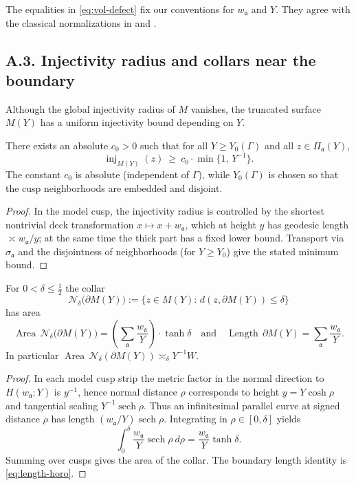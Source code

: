 \begin{remark}
The equalities in \eqref{eq:vol-defect} fix our conventions
for $w_{\mathfrak a}$ and $Y$. They agree with the classical normalizations in
\cite[Chap.~3]{Buser1992} and \cite[§3]{Iwaniec2002}.
\end{remark}

\subsection*{A.3. Injectivity radius and collars near the boundary}

\noindent
Although the global injectivity radius of $M$ vanishes, the truncated surface
$M(Y)$ has a uniform injectivity bound depending on $Y$.

\begin{lemma}\label{lem:inj-cusp}
There exists an absolute $c_0>0$ such that for all $Y\ge Y_0(\Gamma)$ and all
$z\in \Pi_{\mathfrak a}(Y)$,
\[
\operatorname{inj}_{M(Y)}(z)\ \ge\ c_0\cdot \min\{1,\,Y^{-1}\}.
\]
The constant $c_0$ is absolute (independent of $\Gamma$), while $Y_0(\Gamma)$ is
chosen so that the cusp neighborhoods are embedded and disjoint.
\end{lemma}

\begin{proof}
In the model cusp, the injectivity radius is controlled by the shortest
nontrivial deck transformation $x\mapsto x+w_{\mathfrak a}$, which at height
$y$ has geodesic length $\asymp w_{\mathfrak a}/y$; at the same time the thick
part has a fixed lower bound. Transport via $\sigma_{\mathfrak a}$ and the
disjointness of neighborhoods (for $Y\ge Y_0$) give the stated minimum bound.
\end{proof}

\begin{proposition}\label{prop:collar}
For $0<\delta\le \tfrac12$ the collar
\[
\mathcal N_\delta\big(\partial M(Y)\big):=\{z\in M(Y):\, d(z,\partial M(Y))\le \delta\}
\]
has area
\[
\operatorname{Area}\,\mathcal N_\delta\big(\partial M(Y)\big)
=\left(\sum_{\mathfrak a}\frac{w_{\mathfrak a}}{Y}\right)\cdot \tanh\delta
\quad\text{and}\quad
\operatorname{Length}\,\partial M(Y)=\sum_{\mathfrak a}\frac{w_{\mathfrak a}}{Y}.
\]
In particular $\operatorname{Area}\,\mathcal N_\delta(\partial M(Y))\asymp_\delta Y^{-1}W$.
\end{proposition}

\begin{proof}
In each model cusp strip the metric factor in the normal direction to
$H(w_{\mathfrak a};Y)$ is $y^{-1}$, hence normal distance $\rho$ corresponds to
height $y= Y\cosh\rho$ and tangential scaling $Y^{-1}\operatorname{sech}\rho$.
Thus an infinitesimal parallel curve at signed distance $\rho$ has length
$(w_{\mathfrak a}/Y)\operatorname{sech}\rho$. Integrating in $\rho\in[0,\delta]$
yields
\[
\int_0^\delta \frac{w_{\mathfrak a}}{Y}\operatorname{sech}\rho\ d\rho
=\frac{w_{\mathfrak a}}{Y}\tanh\delta.
\]
Summing over cusps gives the area of the collar. The boundary length identity is
\eqref{eq:length-horo}.
\end{proof}

